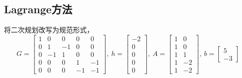 \documentclass[11pt,a4paper]{article}
\begin{document}
\subsection{Lagrange方法}

将二次规划改写为规范形式，
\[G=\begin{bmatrix}
1 & 0 & 0 & 0 & 0\\
0 & 1 & -1 & 0 & 0\\
0 & -1 & 1 & 0 & 0\\
0 & 0 & 0 & 1 & -1\\
0 & 0 & 0 & -1 & -1
\end{bmatrix},~
h=\begin{bmatrix}
-2\\0\\0\\0\\0
\end{bmatrix},~
A=\begin{bmatrix}
1 & 0\\
1 & 0\\
1 & 1\\
1 & -2\\
1 &-2
\end{bmatrix},~
b=\begin{bmatrix}
5\\-3
\end{bmatrix}\]
\end{document}
